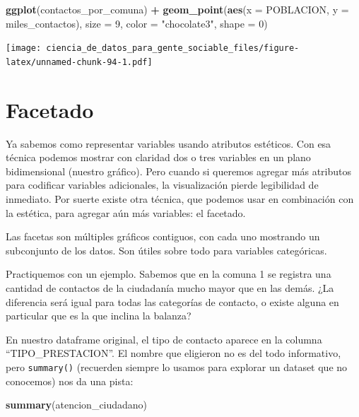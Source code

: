 \documentclass[spanish,]{book}
\newenvironment{Shaded}{\begin{snugshade}}{\end{snugshade}}
\newcommand{\DataTypeTok}[1]{\textcolor[rgb]{0.13,0.29,0.53}{#1}}
\newcommand{\DecValTok}[1]{\textcolor[rgb]{0.00,0.00,0.81}{#1}}
\newcommand{\KeywordTok}[1]{\textcolor[rgb]{0.13,0.29,0.53}{\textbf{#1}}}
\newcommand{\NormalTok}[1]{#1}
\newcommand{\OperatorTok}[1]{\textcolor[rgb]{0.81,0.36,0.00}{\textbf{#1}}}
\newcommand{\StringTok}[1]{\textcolor[rgb]{0.31,0.60,0.02}{#1}}
\begin{document}
\begin{Shaded}
\begin{Highlighting}[]
\KeywordTok{ggplot}\NormalTok{(contactos_por_comuna) }\OperatorTok{+}\StringTok{ }
\StringTok{    }\KeywordTok{geom_point}\NormalTok{(}\KeywordTok{aes}\NormalTok{(}\DataTypeTok{x =}\NormalTok{ POBLACION, }\DataTypeTok{y =}\NormalTok{ miles_contactos), }
               \DataTypeTok{size =} \DecValTok{9}\NormalTok{, }\DataTypeTok{color =} \StringTok{"chocolate3"}\NormalTok{, }\DataTypeTok{shape =} \DecValTok{0}\NormalTok{)}
\end{Highlighting}
\end{Shaded}

\texttt{[image: ciencia\_de\_datos\_para\_gente\_sociable\_files/figure-latex/unnamed-chunk-94-1.pdf]}

\hypertarget{facetado}{%
\section{Facetado}\label{facetado}}

Ya sabemos como representar variables usando atributos estéticos. Con esa técnica podemos mostrar con claridad dos o tres variables en un plano bidimensional (nuestro gráfico). Pero cuando si queremos agregar más atributos para codificar variables adicionales, la visualización pierde legibilidad de inmediato. Por suerte existe otra técnica, que podemos usar en combinación con la estética, para agregar aún más variables: el facetado.

Las facetas son múltiples gráficos contiguos, con cada uno mostrando un subconjunto de los datos. Son útiles sobre todo para variables categóricas.

Practiquemos con un ejemplo. Sabemos que en la comuna 1 se registra una cantidad de contactos de la ciudadanía mucho mayor que en las demás. ¿La diferencia será igual para todas las categorías de contacto, o existe alguna en particular que es la que inclina la balanza?

En nuestro dataframe original, el tipo de contacto aparece en la columna ``TIPO\_PRESTACION''. El nombre que eligieron no es del todo informativo, pero \texttt{summary()} (recuerden siempre lo usamos para explorar un dataset que no conocemos) nos da una pista:

\begin{Shaded}
\begin{Highlighting}[]
\KeywordTok{summary}\NormalTok{(atencion_ciudadano)}
\end{Highlighting}
\end{Shaded}
\end{document}
